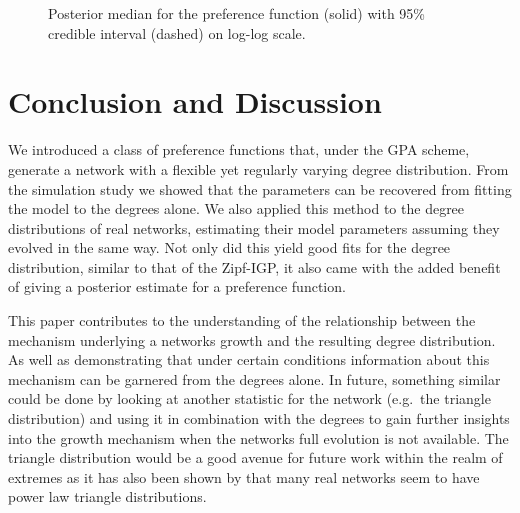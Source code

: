 \documentclass[
  sn-basic,
]{sn-jnl}
\theoremstyle{plain}
\theoremstyle{plain}
\theoremstyle{remark}
\begin{document}
\begin{figure}


\caption{\label{fig-pa}Posterior median for the preference function
(solid) with 95\% credible interval (dashed) on log-log scale.}

\end{figure}%

\newpage

\section{Conclusion and Discussion}\label{sec-conc}

We introduced a class of preference functions that, under the GPA
scheme, generate a network with a flexible yet regularly varying degree
distribution. From the simulation study we showed that the parameters
can be recovered from fitting the model to the degrees alone. We also
applied this method to the degree distributions of real networks,
estimating their model parameters assuming they evolved in the same way.
Not only did this yield good fits for the degree distribution, similar
to that of the Zipf-IGP, it also came with the added benefit of giving a
posterior estimate for a preference function.

This paper contributes to the understanding of the relationship between
the mechanism underlying a networks growth and the resulting degree
distribution. As well as demonstrating that under certain conditions
information about this mechanism can be garnered from the degrees alone.
In future, something similar could be done by looking at another
statistic for the network (e.g.~the triangle distribution) and using it
in combination with the degrees to gain further insights into the growth
mechanism when the networks full evolution is not available. The
triangle distribution would be a good avenue for future work within the
realm of extremes as it has also been shown by \citet{kang11} that many
real networks seem to have power law triangle distributions.
\end{document}
